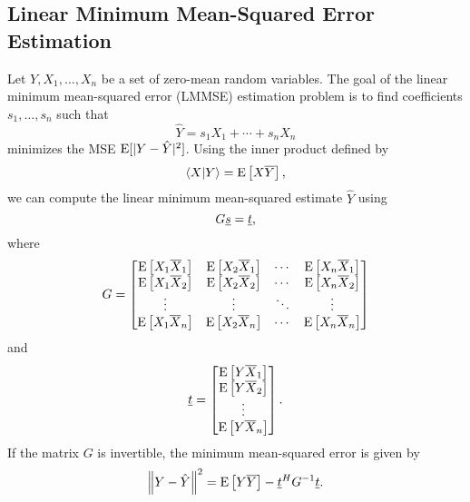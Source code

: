 \subsection{Linear Minimum Mean-Squared Error Estimation}

Let $Y, X_1, \ldots, X_n$ be a set of zero-mean random variables.
The goal of the linear minimum mean-squared error (LMMSE) estimation  problem is to find coefficients $s_1, \ldots, s_n$ such that
\[ \hat{Y} = s_1 X_1 + \cdots + s_n X_n \]
minimizes the MSE $\mathrm{E}[|Y-\hat{Y}|^2]$.
Using the inner product defined by
\begin{equation} \label{equation:ExpectationInnerProduct}
\left\langle X | Y \right\rangle = \mathrm{E} \left[ X \overline{Y} \right],
\end{equation}
we can compute the linear minimum mean-squared estimate $\hat{Y}$ using
\begin{equation*}
G \underline{s} = \underline{t},
\end{equation*}
where
\begin{equation*}
G = \begin{bmatrix}
\mathrm{E} \left[ X_1 \overline{X}_1 \right]
& \mathrm{E} \left[ X_2 \overline{X}_1 \right] & \cdots
& \mathrm{E} \left[ X_n \overline{X}_1 \right] \\
\mathrm{E} \left[ X_1 \overline{X}_2 \right]
& \mathrm{E} \left[ X_2 \overline{X}_2 \right] & \cdots
& \mathrm{E} \left[ X_n \overline{X}_2 \right] \\
\vdots & \vdots & \ddots & \vdots \\
\mathrm{E} \left[ X_1 \overline{X}_n \right]
& \mathrm{E} \left[ X_2 \overline{X}_n \right] & \cdots
& \mathrm{E} \left[ X_n \overline{X}_n \right] \\
\end{bmatrix}
\end{equation*}
and
\begin{equation*}
\underline{t} = \begin{bmatrix}
\mathrm{E} \left[ Y \overline{X}_1 \right] \\
\mathrm{E} \left[ Y \overline{X}_2 \right] \\ \vdots \\
\mathrm{E} \left[ Y \overline{X}_n \right] \end{bmatrix} .
\end{equation*}
If the matrix $G$ is invertible, the minimum mean-squared error is given by
\begin{equation*}
\left\| Y - \hat{Y} \right\|^2 = \mathrm{E} \left[ Y \overline{Y} \right]
- \underline{t}^H G^{-1} \underline{t} .
\end{equation*}


